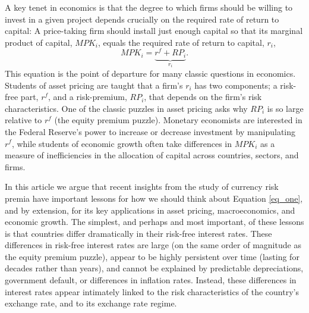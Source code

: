 \documentclass{ar-1col}
\begin{document}
A key tenet in economics is that the degree to which firms should be
willing to invest in a given project depends crucially on the required
rate of return to capital: A price-taking firm should install just
enough capital so that its marginal product of capital, $MPK_i$,
equals the required rate of return to capital, $r_i$,
\begin{equation}
  MPK_i=\underbrace{r^f+RP_i}_{r_i}.
  \label{eq_one}
\end{equation} 
This equation is the point of departure for many classic questions in
economics. Students of asset pricing are taught that a firm's $r_i$
has two components; a risk-free part, $r^f$, and a risk-premium,
$RP_i$, that depends on the firm's risk characteristics. One of the
classic puzzles in asset pricing asks why $RP_i$ is so large relative to
$r^f$ (the equity premium puzzle). Monetary economists are interested
in the Federal Reserve's power to increase or decrease investment by
manipulating $r^f$, while students of economic growth often take
differences in $MPK_i$ as a measure of inefficiencies in the
allocation of capital across countries, sectors, and firms.

In this article we argue that recent insights from the study of
currency risk premia have important lessons for how we should think
about Equation \eqref{eq_one}, and by extension, for its key
applications in asset pricing, macroeconomics, and economic growth.
The simplest, and perhaps and most important, of these lessons is that
countries differ dramatically in their risk-free interest rates. These
differences in risk-free interest rates are large (on the same order
of magnitude as the equity premium puzzle), appear to be highly
persistent over time (lasting for decades rather than years), and
cannot be explained by predictable depreciations, government default,
or differences in inflation rates. Instead, these differences in
interest rates appear intimately linked to the risk characteristics of
the country's exchange rate, and to its exchange rate regime.
\end{document}
